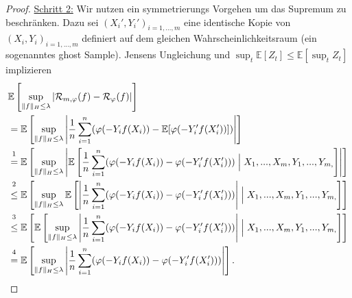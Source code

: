 \documentclass{article}
\theoremstyle{plain}
\theoremstyle{definition}
\begin{document}
\begin{proof}
        \underline{Schritt 2:}
        Wir nutzen ein symmetrierungs Vorgehen um das Supremum zu beschränken. Dazu sei $(X_{i}', Y_{i}')_{i = 1,...,m}$ eine identische Kopie von $(X_i,Y_i)_{i=1,...,m}$ definiert auf dem gleichen Wahrscheinlichkeitsraum (ein sogenanntes ghost Sample). Jensens Ungleichung und $\sup_{t} \mathbb{E}[Z_{t}] \leq \mathbb{E}[\sup_{t} Z_{t}]$ implizieren
            \begin{align*}
            &\mathbb{E}\left[\sup_{\|f\|_{H} \leq \lambda} |\mathcal{R}_{m, \varphi}(f) - \mathcal{R}_{\varphi}(f)|\right] \\
            &=
            \mathbb{E}\left[\sup_{\|f\|_{H} \leq \lambda} \left|\frac{1}{n} \sum_{i = 1}^{n}(\varphi(-Y_{i}f(X_{i})) - \mathbb{E}[\varphi(-Y_{i}' f(X_{i}'))])\right|\right] \\
            &\overset{\footnotemark[1]}=
            \mathbb{E}\left[\sup_{\|f\|_{H}\leq \lambda} \left|\mathbb{E}\left[\frac{1}{n} \sum_{i=1}^{n} (\varphi(-Y_{i} f(X_{i}))-\varphi(-Y_{i}' f(X_{i}'))) \mathrel{\Big|} X_{1},...,X_{m},Y_{1},...,Y_{m,}\right]\right|\right]\\
            &\overset{\footnotemark[2]}\leq
            \mathbb{E}\left[\sup_{\|f\|_{H}\leq \lambda} \mathbb{E}\left[\left|\frac{1}{n} \sum_{i=1}^{n} (\varphi(-Y_{i} f(X_{i}))-\varphi(-Y_{i}' f(X_{i}')))\right| \mathrel{\Big|} X_{1},...,X_{m},Y_{1},...,Y_{m,}\right]\right]\\
            &\overset{\footnotemark[3]}\leq
            \mathbb{E}\left[\mathbb{E}\left[\sup_{\|f\|_{H}\leq \lambda} \left|\frac{1}{n} \sum_{i=1}^{n} (\varphi(-Y_{i} f(X_{i}))-\varphi(-Y_{i}' f(X_{i}')))\right| \mathrel{\Big|} X_{1},...,X_{m},Y_{1},...,Y_{m,}\right]\right]\\
            &\overset{\footnotemark[4]}=
            \mathbb{E}\left[\sup_{\|f\|_{H}\leq \lambda} \left|\frac{1}{n} \sum_{i=1}^{n} (\varphi(-Y_{i} f(X_{i}))-\varphi(-Y_{i}' f(X_{i}')))\right|\right].
            \end{align*} 
        

\end{proof}
\end{document}

